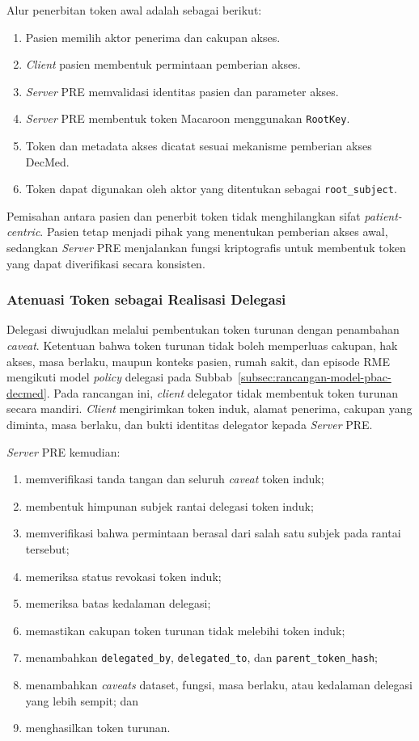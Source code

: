 Alur penerbitan token awal adalah sebagai berikut:

\begin{enumerate}
	\item Pasien memilih aktor penerima dan cakupan akses.
	\item \textit{Client} pasien membentuk permintaan pemberian akses.
	\item \textit{Server} PRE memvalidasi identitas pasien dan parameter akses.
	\item \textit{Server} PRE membentuk token Macaroon menggunakan \texttt{RootKey}.
	\item Token dan metadata akses dicatat sesuai mekanisme pemberian akses DecMed.
	\item Token dapat digunakan oleh aktor yang ditentukan sebagai \texttt{root\_subject}.
\end{enumerate}

Pemisahan antara pasien dan penerbit token tidak menghilangkan sifat \textit{patient-centric}. Pasien tetap menjadi pihak yang menentukan pemberian akses awal, sedangkan \textit{Server} PRE menjalankan fungsi kriptografis untuk membentuk token yang dapat diverifikasi secara konsisten.

\subsubsection{Atenuasi Token sebagai Realisasi Delegasi}

Delegasi diwujudkan melalui pembentukan token turunan dengan penambahan \textit{caveat}. Ketentuan bahwa token turunan tidak boleh memperluas cakupan, hak akses, masa berlaku, maupun konteks pasien, rumah sakit, dan episode RME mengikuti model \textit{policy} delegasi pada Subbab~\ref{subsec:rancangan-model-pbac-decmed}. Pada rancangan ini, \textit{client} delegator tidak membentuk token turunan secara mandiri. \textit{Client} mengirimkan token induk, alamat penerima, cakupan yang diminta, masa berlaku, dan bukti identitas delegator kepada \textit{Server} PRE.

\textit{Server} PRE kemudian:

\begin{enumerate}
	\item memverifikasi tanda tangan dan seluruh \textit{caveat} token induk;
	\item membentuk himpunan subjek rantai delegasi token induk;
	\item memverifikasi bahwa permintaan berasal dari salah satu subjek pada rantai tersebut;
	\item memeriksa status revokasi token induk;
	\item memeriksa batas kedalaman delegasi;
	\item memastikan cakupan token turunan tidak melebihi token induk;
	\item menambahkan \texttt{delegated\_by}, \texttt{delegated\_to}, dan \texttt{parent\_token\_hash};
	\item menambahkan \textit{caveats} dataset, fungsi, masa berlaku, atau kedalaman delegasi yang lebih sempit; dan
	\item menghasilkan token turunan.
\end{enumerate}

